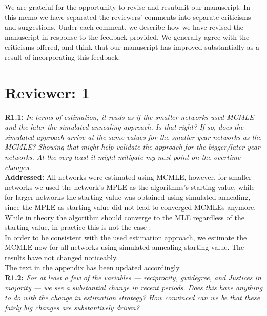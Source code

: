 \documentclass[a4paper,11pt]{texMemo}
\begin{document}
\maketitle

\noindent We are grateful for the opportunity to revise and resubmit our manuscript. In this memo
we have separated the reviewers' comments into separate criticisms and
suggestions. Under each comment, we describe how we have revised the manuscript in
response to the feedback provided. We generally agree with the criticisms offered, and think
that our manuscript has improved substantially as a result of incorporating this feedback. 



\section*{Reviewer: 1}

\noindent \textbf{R1.1:} \emph{ In terms of estimation, it reads as if the smaller networks used MCMLE and the later the simulated annealing approach. Is that right? If so, does the simulated approach arrive at the same values for the smaller year networks as the MCMLE? Showing that might help validate the approach for the bigger/later year networks. At the very least it might mitigate my next point on the overtime changes.   }\\

\noindent \textbf{Addressed:} All networks were estimated using MCMLE, however, for smaller networks we used the network's MPLE as the algorithms's starting value, while for larger networks the starting value was obtained using simulated annealing, since the MPLE as starting value did not lead to converged MCMLEs anymore. While in theory the algorithm should converge to the MLE regardless of the starting value, in practice this is not the case   \cite{hummel2012improving}. \\
In order to be consistent with the used estimation approach, we estimate the MCMLE now for all networks using simulated annealing starting value. The results have not changed noticeably.  \\
The text in the appendix has been updated accordingly.\\

\noindent  \textbf{R1.2:} \emph{ For at least a few of the variables --- reciprocity, gwidegree, and Justices in majority --- we see a substantial change in recent periods. Does this have anything to do with the change in estimation strategy? How convinced can we be that these fairly big changes are substantively driven? }\\
\end{document}
